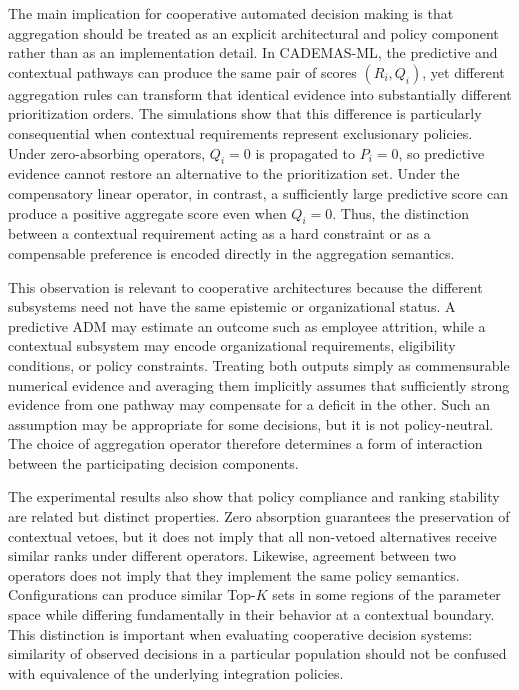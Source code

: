 \documentclass[mathematics,article,submit,moreauthors]{Definitions/mdpi}
\begin{document}
The main implication for cooperative automated decision making is that
aggregation should be treated as an explicit architectural and policy
component rather than as an implementation detail. In CADEMAS-ML, the
predictive and contextual pathways can produce the same pair of scores
$(R_i,Q_i)$, yet different aggregation rules can transform that identical
evidence into substantially different prioritization orders. The simulations
show that this difference is particularly consequential when contextual
requirements represent exclusionary policies. Under zero-absorbing
operators, $Q_i=0$ is propagated to $P_i=0$, so predictive evidence cannot
restore an alternative to the prioritization set. Under the compensatory
linear operator, in contrast, a sufficiently large predictive score can
produce a positive aggregate score even when $Q_i=0$. Thus, the distinction
between a contextual requirement acting as a hard constraint or as a
compensable preference is encoded directly in the aggregation semantics.

This observation is relevant to cooperative architectures because the
different subsystems need not have the same epistemic or organizational
status. A predictive ADM may estimate an outcome such as employee attrition,
while a contextual subsystem may encode organizational requirements,
eligibility conditions, or policy constraints. Treating both outputs simply
as commensurable numerical evidence and averaging them implicitly assumes
that sufficiently strong evidence from one pathway may compensate for a
deficit in the other. Such an assumption may be appropriate for some
decisions, but it is not policy-neutral. The choice of aggregation operator
therefore determines a form of interaction between the participating
decision components.

The experimental results also show that policy compliance and ranking
stability are related but distinct properties. Zero absorption guarantees
the preservation of contextual vetoes, but it does not imply that all
non-vetoed alternatives receive similar ranks under different operators.
Likewise, agreement between two operators does not imply that they implement
the same policy semantics. Configurations can produce similar Top-$K$ sets
in some regions of the parameter space while differing fundamentally in
their behavior at a contextual boundary. This distinction is important when
evaluating cooperative decision systems: similarity of observed decisions
in a particular population should not be confused with equivalence of the
underlying integration policies.
\end{document}
